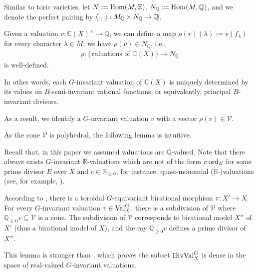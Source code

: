 \newcommand{\V}{\mathcal{V}}

Similar to toric varieties, let $N := \mathrm{Hom}(M, \mathbb{Z})$, $N_\mathbb{Q} := \mathrm{Hom}(M, \mathbb{Q})$, and we denote the perfect pairing by $\left\langle\cdot, \cdot\right\rangle : M_\mathbb{Q} \times N_\mathbb{Q} \to \mathbb{Q}$.

Given a valuation $v : \mathbb{C}(X)^\times \to \mathbb{Q}$, we can define a map $\rho(v)(\lambda) := v(f_\lambda)$ for every character $\lambda \in M$; we have $\rho(v) \in N_\mathbb{Q}$, i.e.,
\begin{equation}
\begin{aligned}
	\rho: \{\text{valuations of }\mathbb{C}(X)\} \to N_\mathbb{Q}
\end{aligned}
\end{equation}
is well-defined.

\begin{remark*}
	In other words, each $G$-invariant valuation of $\mathbb{C}(X)$ is uniquely determined by its values on $B$-semi-invariant rational functions, or equivalently, principal $B$-invariant divisors.
\end{remark*}

As a result, we identify a $G$-invariant valuation $v$ with a vector $\rho(v) \in \V$.

As the cone $\V$ is polyhedral, the following lemma is intuitive.
\begin{remark*}
	Recall that, in this paper we assumed valuations are $\mathbb{Q}$-valued. Note that there always exists $G$-invariant $\mathbb{R}$-valuations which are not of the form $c \: \mathrm{ord}_E$ for some prime divisor $E$ over $X$ and $c \in \mathbb{R}_{\geq 0}$; for instance, quasi-monomial ($\mathbb{R}$-)valuations (see, for example, \cite[\S3]{JM_val_asym_inva_seq_i}).
\end{remark*}
\begin{sketchproof}
	According to \cite[Proposition 2, \S2.4]{Brion_var_sph}, there is a toroidal $G$-equivariant birational morphism $\pi: X' \to X$. For every $G$-invariant valuation $v \in \mathrm{Val}^G_X$, there is a subdivision of $\V$ where $\mathbb{Q}_{\geq 0} v \subseteq \V$ is a cone. The subdivision of $\V$ corresponds to birational model $X''$ of $X'$ (thus a birational model of $X$), and the ray $\mathbb{Q}_{\geq 0} v$ defines a prime divisor of $X''$.
\end{sketchproof}

This lemma is stronger than \cite[Proposition 2.19]{Golota_Delta_Fano_large_aut}, which proves the subset $\mathrm{DivVal}^G_X$ is dense in the space of real-valued $G$-invariant valuations.


